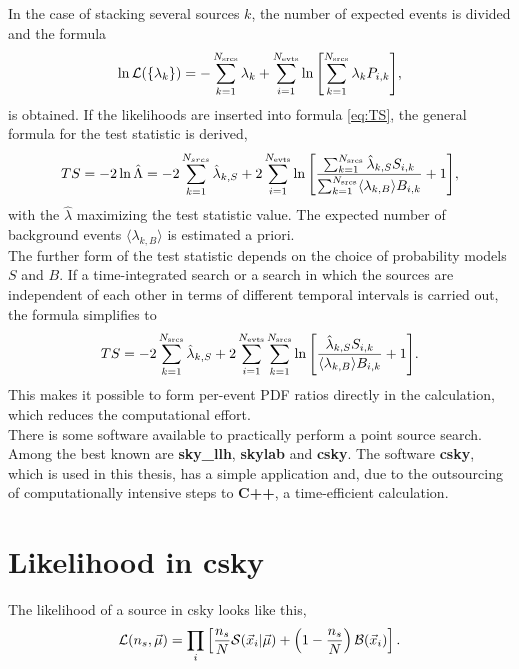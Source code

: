In the case of stacking several sources $k$, the number of expected events is divided and the formula
\begin{equation}
  \ln\mathcal{L}(\{\lambda_k\}) = -\sum^{N_\text{srcs}}_{k=1}\lambda_k + \sum^{N_\text{evts}}_{i=1}\ln{\left[ \sum^{N_\text{srcs}}_{k=1}\lambda_k P_{i,k} \right]},
\end{equation}
is obtained.
If the likelihoods are inserted into formula \eqref{eq:TS}, the general formula for the test statistic is derived,
\begin{equation}
    TS = -2\ln{\hat\Lambda} = -2\sum_{k=1}^{N_{srcs}}\hat\lambda_{k,S} + 2\sum_{i=1}^{N_{\text{evts}}}\ln{\left[ \frac{\sum_{k=1}^{N_{\text{srcs}}}\hat\lambda_{k,S}S_{i,k}}{\sum_{k=1}^{N_{\text{srcs}}}\langle\lambda_{k,B}\rangle B_{i,k}}+1 \right]},
\end{equation}
with the $\hat\lambda$ maximizing the test statistic value.
The expected number of background events $\langle\lambda_{k,B}\rangle$ is estimated a priori.\\
The further form of the test statistic depends on the choice of probability models $S$ and $B$.
If a time-integrated search or a search in which the sources are independent of each other in terms of different temporal intervals is carried out, the formula simplifies to
\begin{equation}
    TS = -2\sum_{k=1}^{N_{\text{srcs}}}\hat\lambda_{k,S} + 2\sum_{i=1}^{N_{\text{evts}}}\sum_{k=1}^{N_{\text{srcs}}}\ln{\left[ \frac{\hat\lambda_{k,S}S_{i,k}}{\langle\lambda_{k,B}\rangle B_{i,k}}+1 \right]}.
\end{equation}
This makes it possible to form per-event PDF ratios directly in the calculation, which reduces the computational effort.\\
There is some software available to practically perform a point source search.
Among the best known are \textbf{sky\_llh}, \textbf{skylab} and \textbf{csky}. The software \textbf{csky}, which is used in this thesis, has a simple application and, due to the outsourcing of computationally intensive steps to \textbf{C++}, a time-efficient calculation.

\section{Likelihood in csky}

The likelihood of a source in csky looks like this,
\begin{equation}
  \mathcal{L}(n_s,\vec{\mu})
  = \prod_i \left[ 
    \frac{n_s}{N} \mathcal{S}(\vec{x}_i|\vec{\mu})
    + \left( 1 - \frac{n_s}{N} \right) \mathcal{B}(\vec{x}_i)
   \right].
  \label{eq:lh}
\end{equation}

